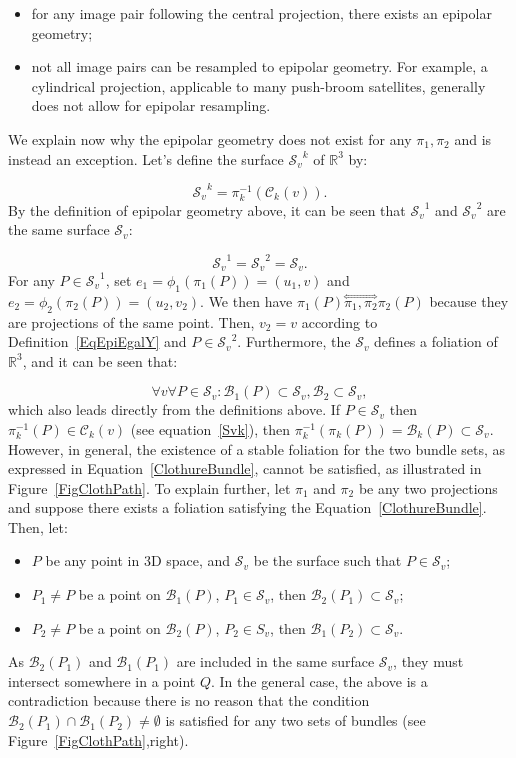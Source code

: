 \documentclass{ipol}
\newcommand{\RR}{\ensuremath{\mathbb{R}}}
\newcommand{\HComp}{\overset{\Longleftrightarrow}{\scriptscriptstyle \pi_1,\pi_2}}
\newcommand{\Bund}[1]{\ensuremath{\mathcal{B}_{#1}}}
\newcommand{\BundO}{\Bund{1}}
\newcommand{\BundT}{\Bund{2}}
\newcommand{\BundK}{\Bund{k}}
\newcommand{\CurveE}[1]{\ensuremath{\mathcal{C}_{#1}}}
\newcommand{\CurveK}{\CurveE{k}}
\newcommand{\Sv}{\ensuremath{\mathcal{S}_{v}}}
\begin{document}
\begin{itemize}
    \item for any image pair following the {central projection}, there exists  an epipolar geometry;

    \item  not all image pairs can be resampled to epipolar geometry. For example, a cylindrical projection, applicable to many push-broom satellites, generally does not allow for epipolar resampling.

\end{itemize}
We explain now why the epipolar geometry does not exist for any $\pi_1,\pi_2$ and is instead an exception. Let's define the surface $\Sv^k$ of $\RR^3$ by:

\begin{equation}
   \Sv^k = \pi_k^{-1}(\CurveK(v)).  \label{Svk}
\end{equation}
By the definition of {epipolar geometry} above, it can be seen that $\Sv^1$ and $\Sv^2$ are the same surface $\Sv$:

\begin{equation}
   \Sv^1 = \Sv^2 = \Sv.
\end{equation}
For any $P\in\Sv^1$, set  $e_1=\phi_1(\pi_1(P))=(u_1,v)$
and $e_2=\phi_2(\pi_2(P))=(u_2,{v_2})$. We then have $\pi_1(P) \HComp \pi_2(P)$ because they are projections
of the same point. Then, $v_2=v$ according to Definition~\ref{EqEpiEgalY} and $P \in \Sv^2$. Furthermore, the $\Sv$ defines a foliation of $\RR^3$, and it can be seen that:

\begin{equation}
   \forall v \forall P \in \Sv :  \BundO(P) \subset \Sv , \BundT \subset \Sv, \label{ClothureBundle}
\end{equation}
which also leads directly from the definitions above. If $P \in \Sv$ then $\pi_k^{-1}(P) \in \CurveK(v)$
(see equation~\eqref{Svk}), then $\pi_k^{-1}(\pi_k(P)) = \BundK(P) \subset \Sv$.
%
However, in general, the existence of a stable foliation for the two bundle sets, as expressed in Equation~\eqref{ClothureBundle},
cannot  be satisfied, as illustrated 
in Figure~\ref{FigClothPath}.  To explain further, let $\pi_1$ and $\pi_2$ be any two  projections and suppose
there exists  a foliation satisfying the Equation~\eqref{ClothureBundle}. Then, let: 

\begin{itemize}
   \item   $P$ be any point in $3$D space, and $\Sv$ be the surface such that $P \in \Sv$;
   \item   $P_1 \neq P$ be a point on $\BundO(P)$, $P_1 \in \Sv$, then $\BundT(P_1) \subset \Sv$;
   \item   $P_2 \neq P$ be a point on $\BundT(P)$, $P_2 \in S_v$, then $\BundO(P_2) \subset \Sv$.
\end{itemize}
As $\BundT(P_1)$ and $\BundO(P_1)$ are included in the same surface $\Sv$, they
            must intersect somewhere in a point $Q$.
In the general case, the above is a contradiction because  there is no reason that the condition $\BundT(P_1) \cap \BundO(P_2) \neq \emptyset $ is satisfied for any two sets
of bundles (see Figure~\ref{FigClothPath},right).
\end{document}
